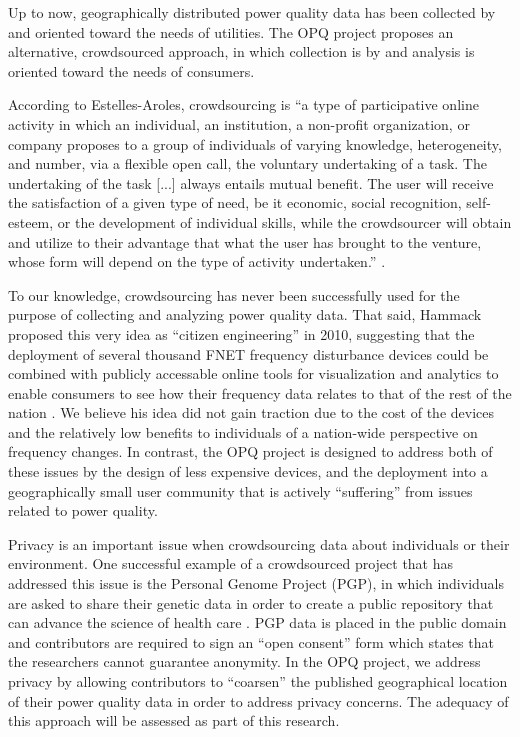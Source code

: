 Up to now, geographically distributed power quality data has been collected by and oriented toward the needs of utilities. The OPQ project proposes an alternative, crowdsourced approach, in which collection is by and analysis is oriented toward the needs of consumers.   

According to Estelles-Aroles, crowdsourcing is ``a type of participative online activity in which an individual, an institution, a non-profit organization, or company proposes to a group of individuals of varying knowledge, heterogeneity, and number, via a flexible open call, the voluntary undertaking of a task. The undertaking of the task [...] always entails mutual benefit. The user will receive the satisfaction of a given type of need, be it economic, social recognition, self-esteem, or the development of individual skills, while the crowdsourcer will obtain and utilize to their advantage that what the user has brought to the venture, whose form will depend on the type of activity undertaken.'' \cite{Estelles-Aroles2012}.

To our knowledge, crowdsourcing has never been successfully used for the purpose of collecting and analyzing power quality data.  That said, Hammack proposed this very idea as ``citizen engineering'' in 2010, suggesting that the deployment of several thousand FNET frequency disturbance devices could be combined with publicly accessable online tools for visualization and analytics to enable consumers to see how their frequency data relates to that of the rest of the nation \cite{Hammack2010}.   We believe his idea did not gain traction due to the cost of the devices and the relatively low benefits to individuals of a nation-wide perspective on frequency changes.  In contrast, the OPQ project is designed to address both of these issues by the design of less expensive devices, and the deployment into a geographically small user community that is actively ``suffering'' from issues related to power quality.  

Privacy is an important issue when crowdsourcing data about individuals or their environment. One successful example of a crowdsourced project that has addressed this issue is the Personal Genome Project (PGP), in which individuals are asked to share their genetic data in order to create a public repository that can advance the science of health care \cite{Church2005}. PGP data is placed in the public domain and contributors are required to sign an ``open consent'' form which states that the researchers cannot guarantee anonymity. In the OPQ project, we address privacy by allowing contributors to ``coarsen'' the published geographical location of their power quality data in order to address privacy concerns.  The adequacy of this approach will be assessed as part of this research.

